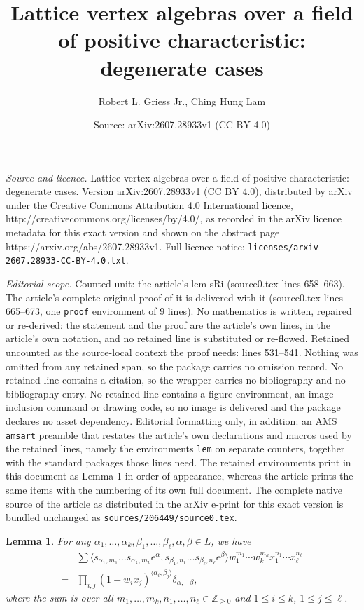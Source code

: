 \documentclass[10pt,a4paper]{amsart}
\title{Lattice vertex algebras over a field of positive characteristic: degenerate cases}
\author{Robert L. Griess Jr., Ching Hung Lam}
\date{Source: arXiv:2607.28933v1 (CC BY 4.0)}
\newtheorem{lem}{Lemma}
\def\ZZ{{\mathbb Z}}
\begin{document}
\maketitle

\noindent\emph{Source and licence.} Lattice vertex algebras over a field of positive characteristic: degenerate cases. Version arXiv:2607.28933v1 (CC BY 4.0), distributed by arXiv under the Creative Commons Attribution 4.0 International licence, http://creativecommons.org/licenses/by/4.0/, as recorded in the arXiv licence metadata for this exact version and shown on the abstract page https://arxiv.org/abs/2607.28933v1. Full licence notice: \texttt{licenses/arxiv-2607.28933-CC-BY-4.0.txt}.\par\smallskip

\noindent\textit{Editorial scope.} Counted unit: the article's lem sRi (source0.tex lines 658--663). The article's complete original proof of it is delivered with it (source0.tex lines 665--673, one \texttt{proof} environment of 9 lines). No mathematics is written, repaired or re-derived: the statement and the proof are the article's own lines, in the article's own notation, and no retained line is substituted or re-flowed.  Retained uncounted as the source-local context the proof needs: lines 531--541.  Nothing was omitted from any retained span, so the package carries no omission record.  No retained line contains a citation, so the wrapper carries no bibliography and no bibliography entry.  No retained line contains a figure environment, an image-inclusion command or drawing code, so no image is delivered and the package declares no asset dependency.  Editorial formatting only, in addition: an AMS \texttt{amsart} preamble that restates the article's own declarations and macros used by the retained lines, namely the environments \texttt{lem} on separate counters, together with the standard packages those lines need.  The retained environments print in this document as Lemma 1 in order of appearance, whereas the article prints the same items with the numbering of its own full document.  The complete native source of the article as distributed in the arXiv e-print for this exact version is bundled unchanged as \texttt{sources/206449/source0.tex}.
\begin{lem}\label{innerprod}
For any $\alpha_1,\dots, \alpha_k, \beta_1, \dots, \beta_\ell, \alpha, \beta \in L$, we have 
\begin{equation*} %
	\begin{split}
& \sum\langle s_{\alpha_1,m_1} \dots s_{\alpha_k,m_k}e^\alpha, s_{\beta_1,n_1} \dots s_{\beta_\ell,n_\ell}e^\beta \rangle 
w_1^{m_1}\cdots w_k^{m_k} x_1^{n_1} \cdots x_\ell^{n_{\ell}}\\
=  &\prod_{i,j} (1-w_ix_j)^{\langle \alpha_i, \beta_j \rangle}\delta_{\alpha,-\beta}, 
\end{split}
\end{equation*}
where the sum is over all $m_1, \dots, m_k,n_1,\dots, n_\ell \in \ZZ_{\geq 0}$ and  $ 1\leq i\leq  k$, $ 1 \leq j \leq \ell$.  
\end{lem}
\end{document}
